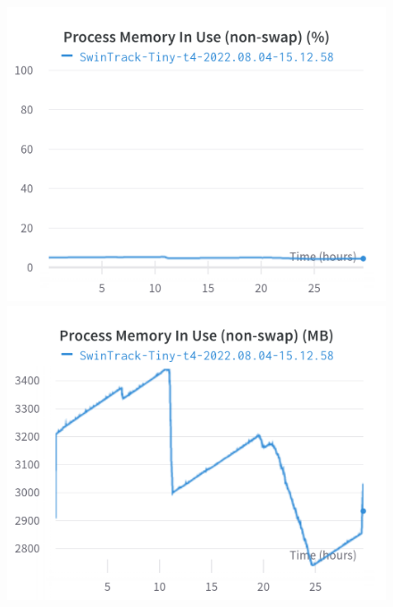 \documentclass{article}
\begin{document}
\begin{figure}[h]
\includegraphics[width=\linewidth]{charts/Section-4-Panel-16-qw9ov0ebc}
\caption{}
\endminipage\hfill
{}
\includegraphics[width=\linewidth]{charts/Section-4-Panel-17-79vo2c6vx}
\caption{}
\endminipage
\end{figure}
\end{document}
